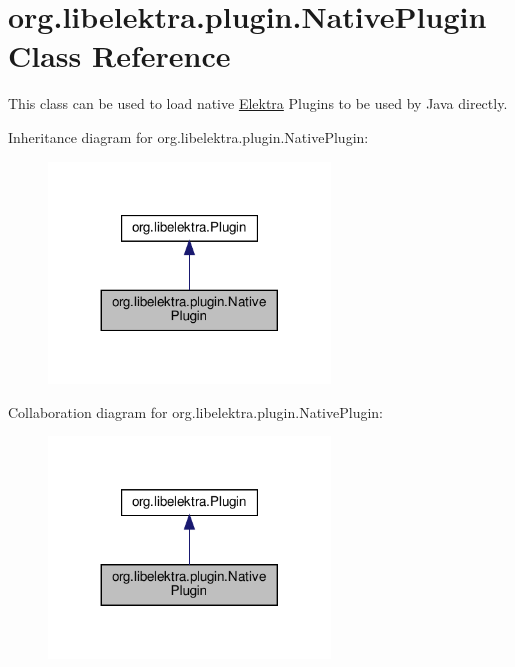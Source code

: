 \hypertarget{classorg_1_1libelektra_1_1plugin_1_1NativePlugin}{}\section{org.\+libelektra.\+plugin.\+Native\+Plugin Class Reference}
\label{classorg_1_1libelektra_1_1plugin_1_1NativePlugin}


This class can be used to load native \hyperlink{interfaceorg_1_1libelektra_1_1Elektra}{Elektra} Plugins to be used by Java directly.  




Inheritance diagram for org.\+libelektra.\+plugin.\+Native\+Plugin\+:
\nopagebreak
\begin{figure}[H]
\begin{center}
\leavevmode
\includegraphics[width=212pt]{classorg_1_1libelektra_1_1plugin_1_1NativePlugin__inherit__graph}
\end{center}
\end{figure}


Collaboration diagram for org.\+libelektra.\+plugin.\+Native\+Plugin\+:
\nopagebreak
\begin{figure}[H]
\begin{center}
\leavevmode
\includegraphics[width=212pt]{classorg_1_1libelektra_1_1plugin_1_1NativePlugin__coll__graph}
\end{center}
\end{figure}
